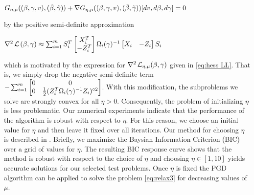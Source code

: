 \centerline{$
 G_{\eta,\mu}((\beta, \gamma, v), (\tilde\beta, \tilde\gamma))+
 \nabla G_{\eta,\mu}((\beta, \gamma, v), (\tilde\beta, \tilde\gamma))
 [dv, d\beta, d\gamma] =0
$}

\noindent
by the positive semi-definite approximation 

 \centerline{$
\nabla^2\operatorname{\mathcal{L}}{(\beta,\gamma)} \approx \sum_{i=1}^m
S_i^T\begin{bmatrix}X_i^T\\ -Z_i^T\end{bmatrix}
\Omega_i(\gamma)^{-1}
\begin{bmatrix}X_i& -Z_i\end{bmatrix}S_i
$}

\noindent
which is motivated by the expression for $\nabla^2\operatorname{\mathcal{L}}_{{\eta,\mu}}(\beta,\gamma)$ given in
\eqref{eq:hess LL}. That is, we simply drop the negative semi-definite term
$-\sum_{i=1}^m\begin{bmatrix}
0&0\\ 0& \frac{1}{2}(Z_i^T\Omega_i(\gamma)^{-1}Z_i)^{\circ2}
\end{bmatrix}$.
With this modification, the subproblems we solve are strongly convex for all $\eta>0$.
Consequently, the problem of initializing $\eta$ is less problematic. Our numerical experiments indicate that the performance of the algorithm is robust with respect to 
$\eta$. For this reason, we choose an initial value for $\eta$ and 
then leave it fixed over all iterations. Our method for choosing $\eta$ is described
in \cite[Section 4, Figure 5]{sholokhov2022relaxation}. Briefly, we maximize the 
Baysian Information Criterion (BIC) over a grid of values for $\eta$. 
 The resulting BIC response curve shows 
that the method is robust with respect to the 
 choice of $\eta$ and choosing $\eta\in [1,10]$ yields 
 accurate solutions for our selected test problems. 
 Once $\eta$ is fixed the
 PGD algorithm can be applied to solve the problem \eqref{eq:relax3}
 for decreasing values of $\mu$. 
